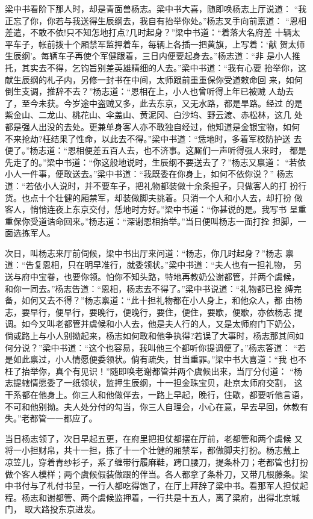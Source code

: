 梁中书看阶下那人时，却是青面兽杨志。梁中书大喜，随即唤杨志上厅说道：
“我正忘了你，你若与我送得生辰纲去，我自有抬举你处。”杨志叉手向前禀道：
“恩相差遣，不敢不依!只不知怎地打点?几时起身？”梁中书道：“着落大名府差
十辆太平车子，帐前拨十个厢禁军监押着车，每辆上各插一把黄旗，上写着：‘献
贺太师生辰纲’。每辆车子再使个军健跟着，三日内便要起身去。”杨志道：“非
是小人推托，其实去不得，乞钧旨别差英雄精细的人去。”梁中书道：“我有心要
抬举你，这献生辰纲的札子内，另修一封书在中间，太师跟前重重保你受道敕命回
来，如何倒生支调，推辞不去？”杨志道：“恩相在上，小人也曾听得上年已被贼
人劫去了，至今未获。今岁途中盗贼又多，此去东京，又无水路，都是旱路。经过
的是紫金山、二龙山、桃花山、伞盖山、黄泥冈、白沙坞、野云渡、赤松林，这几
处都是强人出没的去处。更兼单身客人亦不敢独自经过，他知道是金银宝物，如何
不来抢劫?枉结果了性命，以此去不得。”梁中书道：“恁地时，多着军校防护送
去便了。”杨志道：“恩相便差五百人去，也不济事。这厮们一声听得强人来时，
都是先走了的。”梁中书道：“你这般地说时，生辰纲不要送去了？”杨志又禀道：
“若依小人一件事，便敢送去。”梁中书道：“我既委在你身上，如何不依你说？”
杨志道：“若依小人说时，并不要车子，把礼物都装做十余条担子，只做客人的打
扮行货。也点十个壮健的厢禁军，却装做脚夫挑着。只消一个人和小人去，却打扮
做客人，悄悄连夜上东京交付，恁地时方好。”梁中书道：“你甚说的是。我写书
呈重重保你受道诰命回来。”杨志道：“深谢恩相抬举。”当日便叫杨志一面打拴
担脚，一面选拣军人。

次日，叫杨志来厅前伺候，梁中书出厅来问道：“杨志，你几时起身？”杨志
禀道：“告复恩相，只在明早准行，就委领状。”梁中书道：“夫人也有一担礼物，
另送与府中宝眷，也要你领。怕你不知头路，特地再教奶公谢都管，并两个虞候，
和你一同去。”杨志告道：“恩相，杨志去不得了。”梁中书说道：“礼物都已拴
缚完备，如何又去不得？”杨志禀道：“此十担礼物都在小人身上，和他众人，都
由杨志，要早行，便早行，要晚行，便晚行，要住，便住，要歇，便歇，亦依杨志
提调。如今又叫老都管并虞候和小人去，他是夫人行的人，又是太师府门下奶公，
倘或路上与小人别拗起来，杨志如何敢和他争执得?若误了大事时，杨志那其间如
何分说？”梁中书道：“这个也容易，我叫他三个都听你提调便了。”杨志答道：
“若是如此禀过，小人情愿便委领状。倘有疏失，甘当重罪。”梁中书大喜道：“我
也不枉了抬举你，真个有见识！”随即唤老谢都管并两个虞候出来，当厅分付道：
“杨志提辖情愿委了一纸领状，监押生辰纲，十一担金珠宝贝，赴京太师府交割，
这干系都在他身上。你三人和他做伴去，一路上早起，晚行，住歇，都要听他言语，
不可和他别拗。夫人处分付的勾当，你三人自理会，小心在意，早去早回，休教有
失。”老都管一一都应了。

当日杨志领了，次日早起五更，在府里把担仗都摆在厅前，老都管和两个虞候
又将一小担财帛，共十一担，拣了十一个壮健的厢禁军，都做脚夫打扮。杨志戴上
凉笠儿，穿着青纱衫子，系了缠带行履麻鞋，跨口腰刀，提条朴刀；老都管也打扮
做个客人模样；两个虞候假装做跟的伴当。各人都拿了条朴刀，又带几根藤条。梁
中书付与了札付书呈，一行人都吃得饱了，在厅上拜辞了梁中书。看那军人担仗起
程。杨志和谢都管、两个虞候监押着，一行共是十五人，离了梁府，出得北京城门，
取大路投东京进发。

